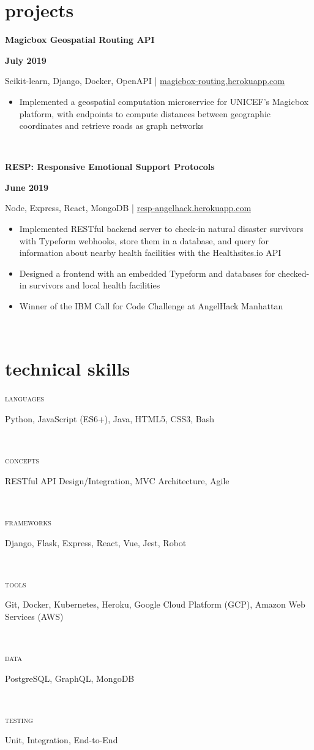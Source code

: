 \documentclass[letterpaper, 10.5pt]{article}
\newcommand{\projectentry}[4]{

    \begin{minipage}[b]{0.5\textwidth}
        \raggedright
        \bf #2
        \end{minipage}%
        \begin{minipage}[b]{0.5\textwidth}
        \raggedleft
        \bf #1
        \end{minipage}

    \begin{minipage}[t]{\linewidth}
    \vspace{-3mm}
    \small #3
    \vspace{-1.75mm}
    \small{#4}
    \end{minipage}\\
    \vspace{1mm}
    }
\newcommand{\skillentry}[2]{
    \begin{minipage}[t]{.15\linewidth}
        \hfill \textsc{#1}
        \end{minipage}
        \hfill\vline\hfill
        \begin{minipage}[t]{.80\linewidth}
        \small{#2}
        \end{minipage}\\
    }
\begin{document}
    \section{projects}


        \projectentry{July 2019}
            {Magicbox Geospatial Routing API}
            {Scikit-learn, Django, Docker, OpenAPI | \href{http://magicbox-routing.herokuapp.com}{magicbox-routing.herokuapp.com}}
            {\begin{itemize}
                \setlength\itemsep{-0.5mm}
                \item Implemented a geospatial computation microservice for UNICEF's Magicbox platform, with endpoints to compute distances between geographic coordinates and retrieve roads as graph networks 
            \end{itemize}
            }

        \projectentry{June 2019}
            {RESP: Responsive Emotional Support Protocols}
            {Node, Express, React, MongoDB | \href{http://resp-angelhack.herokuapp.com}{resp-angelhack.herokuapp.com}}
            {\begin{itemize}
                \setlength\itemsep{-0.5mm}
                \item Implemented RESTful backend server to check-in natural disaster survivors with Typeform webhooks, store them in a database, and query for information about nearby health facilities with the Healthsites.io API
                \item Designed a frontend with an embedded Typeform and databases for checked-in survivors and local health facilities
                \item Winner of the IBM Call for Code Challenge at AngelHack Manhattan
            \end{itemize}
            }
            
    \section{technical skills}

    \skillentry{languages}{Python, JavaScript (ES6+), Java, HTML5, CSS3, Bash}
    \skillentry{concepts}{RESTful API Design/Integration, MVC Architecture, Agile}
    \skillentry{frameworks}{Django, Flask, Express, React, Vue, Jest, Robot}
    \skillentry{tools}{Git, Docker, Kubernetes, Heroku, Google Cloud Platform (GCP), Amazon Web Services (AWS) }
    \skillentry{data}{PostgreSQL, GraphQL, MongoDB}
    \skillentry{testing}{Unit, Integration, End-to-End}
\end{document}
